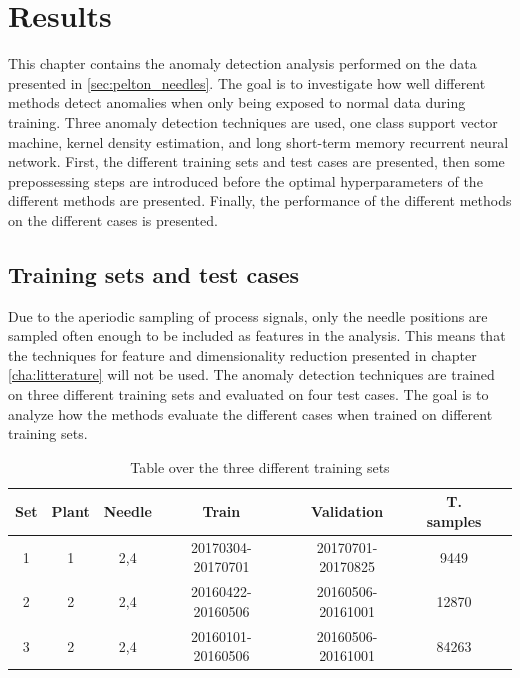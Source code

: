 \chapter{Results}\label{cha:analysis}
This chapter contains the anomaly detection analysis performed on the data presented in \ref{sec:pelton_needles}. The goal is to investigate how well different methods detect anomalies when only being exposed to normal data during training. Three anomaly detection techniques are used, one class support vector machine, kernel density estimation, and long short-term memory recurrent neural network. First, the different training sets and test cases are presented, then some prepossessing steps are introduced before the optimal hyperparameters of the different methods are presented. Finally, the performance of the different methods on the different cases is presented.

    \section{Training sets and test cases}
        Due to the aperiodic sampling of process signals, only the needle positions are sampled often enough to be included as features in the analysis. This means that the techniques for feature and dimensionality reduction presented in chapter \ref{cha:litterature} will not be used. The anomaly detection techniques are trained on three different training sets and evaluated on four test cases. The goal is to analyze how the methods evaluate the different cases when trained on different training sets. 
        
        \begin{table}[]
            \centering
            \begin{tabular}{ccccccc}
                \toprule
                \textbf{Set}    & \textbf{Plant}       & \textbf{Needle}   & \textbf{Train}  & \textbf{Validation}        & \textbf{T. samples}\\ \midrule
                1       & 1                    & 2,4        & 20170304-20170701 & 20170701-20170825 & 9449\\ 
                2       & 2                    & 2,4        & 20160422-20160506 & 20160506-20161001 & 12870\\ 
                3       & 2                    & 2,4        & 20160101-20160506 & 20160506-20161001 & 84263\\ \bottomrule
            \end{tabular}
            \caption{Table over the three different training sets}
            \label{tab:training_cases}
        \end{table}
        
